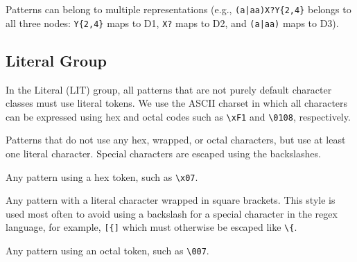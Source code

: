 Patterns can belong to multiple representations (e.g., \verb!(a|aa)X?Y{2,4}! belongs to all three nodes: \verb!Y{2,4}! maps to D1, \verb!X?! maps to D2, and \verb!(a|aa)! maps to D3).




\subsection{Literal Group}
In the Literal (LIT) group, all patterns that are not purely default character classes must use literal tokens.
We use the ASCII charset in which all characters can be expressed using hex and octal codes such as \verb!\xF1! and \verb!\0108!, respectively.



\begin{description} \itemsep -1pt
\item[T1:] Patterns that do not use any hex, wrapped, or octal characters, but use at least one literal character. Special characters are escaped using the backslashes.
\item[T2:] Any pattern using a hex token, such as \verb!\x07!.
\item[T3:] Any pattern with a literal character wrapped in square brackets.
This style is used most often to avoid using a backslash for a special character in the regex language, for example, \verb![{]! which must otherwise be escaped like \verb!\{!.

\item[T4:] Any pattern using an octal token, such as \verb!\007!.
\end{description}

